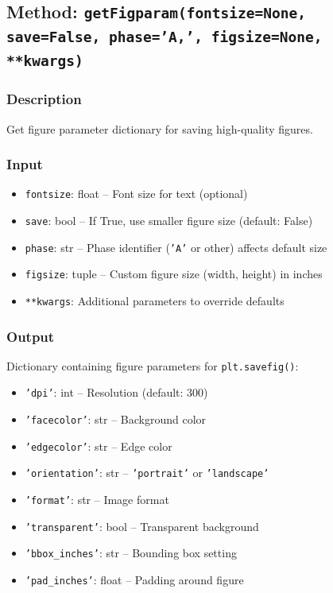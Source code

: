 \documentclass[11pt,a4paper]{article}
\begin{document}
\subsection{Method: \texttt{getFigparam(fontsize=None, save=False, phase='A,', figsize=None, **kwargs)}}

\subsubsection{Description}
Get figure parameter dictionary for saving high-quality figures.

\subsubsection{Input}
\begin{itemize}[leftmargin=*]
    \item \texttt{fontsize}: float -- Font size for text (optional)
    \item \texttt{save}: bool -- If True, use smaller figure size (default: False)
    \item \texttt{phase}: str -- Phase identifier (\texttt{'A'} or other) affects default size
    \item \texttt{figsize}: tuple -- Custom figure size (width, height) in inches
    \item \texttt{**kwargs}: Additional parameters to override defaults
\end{itemize}

\subsubsection{Output}
Dictionary containing figure parameters for \texttt{plt.savefig()}:
\begin{itemize}[leftmargin=*]
    \item \texttt{'dpi'}: int -- Resolution (default: 300)
    \item \texttt{'facecolor'}: str -- Background color
    \item \texttt{'edgecolor'}: str -- Edge color
    \item \texttt{'orientation'}: str -- \texttt{'portrait'} or \texttt{'landscape'}
    \item \texttt{'format'}: str -- Image format
    \item \texttt{'transparent'}: bool -- Transparent background
    \item \texttt{'bbox\_inches'}: str -- Bounding box setting
    \item \texttt{'pad\_inches'}: float -- Padding around figure
\end{itemize}
\end{document}
